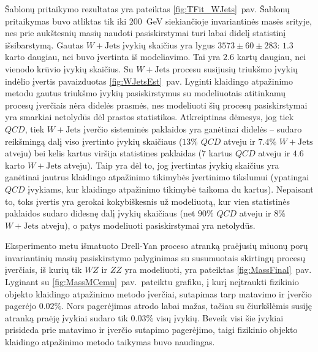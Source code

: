 \documentclass[a4paper, 12pt, oneside]{article}
\newcommand{\ZZ}{Z\! Z}
\newcommand{\WZ}{W\! Z}
\newcommand{\WJets}{W\! +\!\mathrm{Jets}}
\newcommand{\QCD}{QC\! D}
\begin{document}
Šablonų pritaikymo rezultatas yra pateiktas \ref{fig:TFit_WJets}~pav.
Šablonų pritaikymas buvo atliktas tik iki $200$~GeV siekiančioje invariantinės masės srityje, nes prie aukštesnių
masių naudoti pasiskirstymai turi labai didelį statistinį išsibarstymą.
Gautas $\WJets$ įvykių skaičius yra lygus $3573 \pm 60 \pm 283$: $1.3$ karto daugiau, nei buvo įvertinta iš modeliavimo.
Tai yra $2.6$ kartų daugiau, nei vienodo krūvio įvykių skaičius.
Su $\WJets$ procesu susijusių triukšmo įvykių indėlio įvertis pavaizduotas \ref{fig:WJetsEst}~pav.
Lyginti klaidingo atpažinimo metodu gautus triukšmo įvykių pasiskirstymus su modeliuotais atitinkamų procesų įverčiais
nėra didelės prasmės, nes modeliuoti šių procesų pasiskirstymai yra smarkiai netolydūs dėl prastos statistikos.
Atkreiptinas dėmesys, jog tiek $\QCD$, tiek $\WJets$ įverčio sisteminės paklaidos yra ganėtinai didelės -- sudaro
reikšmingą dalį viso įvertinto įvykių skaičiaus ($13\%$ $\QCD$ atveju ir $7.4\%$ $\WJets$ atveju) bei kelis kartus
viršija statistines paklaidas ($7$ kartus $\QCD$ atveju ir $4.6$ karto $\WJets$ atveju).
Taip yra dėl to, jog įvertintas įvykių skaičius yra ganėtinai jautrus klaidingo atpažinimo tikimybės įvertinimo tikslumui
(ypatingai $\QCD$ įvykiams, kur klaidingo atpažinimo tikimybė taikoma du kartus).
Nepaisant to, toks įvertis yra gerokai kokybiškesnis už modeliuotą, kur vien statistinės paklaidos sudaro
didesnę dalį įvykių skaičiaus (net $90\%$ $\QCD$ atveju ir $8\%$ $\WJets$ atveju), o patys modeliuoti pasiskirstymai yra netolydūs.

Eksperimento metu išmatuoto Drell-Yan proceso atranką praėjusių miuonų porų invariantinių masių pasiskirstymo palyginimas
su susumuotais skirtingų procesų įverčiais, iš kurių tik $\WZ$ ir $\ZZ$ yra modeliuoti, yra pateiktas \ref{fig:MassFinal}~pav.
Lyginant su \ref{fig:MassMCemu}~pav.\ pateiktu grafiku, į kurį neįtraukti fizikinio objekto klaidingo atpažinimo metodo
įverčiai, sutapimas tarp matavimo ir įverčio pagerėjo $0.02\%$.
Nors pagerėjimas atrodo labai mažas, tačiau su čiurkšlėmis susiję atranką praėję įvykiai sudaro tik $0.03\%$ visų įvykių.
Beveik visi šie įvykiai prisideda prie matavimo ir įverčio sutapimo pagerėjimo, taigi fizikinio objekto klaidingo
atpažinimo metodo taikymas buvo naudingas.
\end{document}
